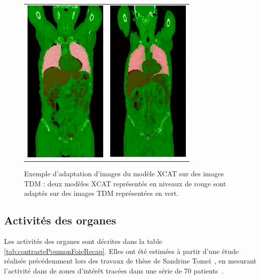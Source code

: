 \begin{figure}
 \centering
 \begin{tabular}{c c}
 \includegraphics[width=4cm]{images/adapt_bru_jea} &
 \includegraphics[width=4cm]{images/adapt_cha_chr}
 \end{tabular}
 \caption[Exemple d’adaptation d’images du modèle XCAT sur des images TDM]{ Exemple d’adaptation d’images du modèle XCAT sur des images TDM : deux modèles XCAT représentés en niveaux de rouge sont adaptés sur des images TDM représentées en vert.}
 \label{fig:adaptXCAT}
\end{figure}

\subsection{Activités des organes}

Les activités des organes sont décrites dans la table \ref{tab:contrastePoumonFoieRecap}. Elles ont été estimées à partir d'une étude réalisée précédemment lors des travaux de thèse de Sandrine Tomeï~\cite{tomei2008development}, en mesurant l'activité dans de zones d'intérêt tracées dans une série de 70 patients~\cite{tomei2010oncopet_db}.

